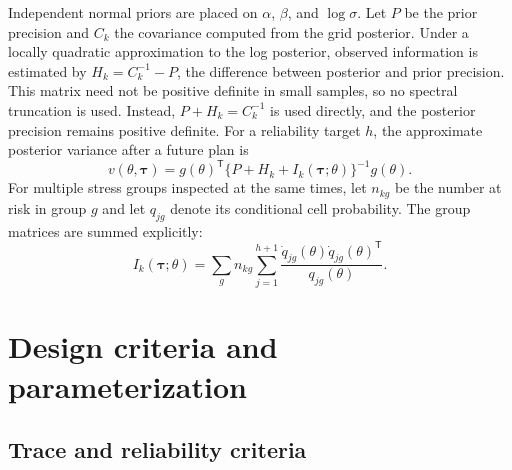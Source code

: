 \documentclass[a4paper,fleqn]{cas-sc}
\begin{document}
Independent normal priors are placed on $\alpha$, $\beta$, and $\log\sigma$. Let $P$ be the prior precision and $C_k$ the covariance computed from the grid posterior. Under a locally quadratic approximation to the log posterior, observed information is estimated by $H_k=C_k^{-1}-P$, the difference between posterior and prior precision. This matrix need not be positive definite in small samples, so no spectral truncation is used. Instead, $P+H_k=C_k^{-1}$ is used directly, and the posterior precision remains positive definite. For a reliability target $h$, the approximate posterior variance after a future plan is
\begin{equation}
v(\theta,\boldsymbol\tau)=g(\theta)^{\mathsf T}
\{P+H_k+I_k(\boldsymbol\tau;\theta)\}^{-1}g(\theta).
\label{eq:variance}
\end{equation}
For multiple stress groups inspected at the same times, let $n_{kg}$ be the number at risk in group $g$ and let $q_{jg}$ denote its conditional cell probability. The group matrices are summed explicitly:
\begin{equation}
I_k(\boldsymbol\tau;\theta)=\sum_g n_{kg}\sum_{j=1}^{h+1}
\frac{\dot q_{jg}(\theta)\dot q_{jg}(\theta)^{\mathsf T}}{q_{jg}(\theta)}.
\end{equation}

\section{Design criteria and parameterization}

\subsection{Trace and reliability criteria}
\end{document}
